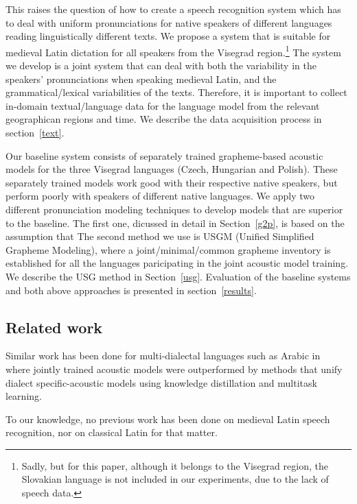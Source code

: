 \documentclass[runningheads,a4paper]{llncs}
\begin{document}
This raises the question of how to create a speech recognition system which has to deal with uniform pronunciations for native speakers of different languages reading linguistically different texts.
We propose a system that is suitable for medieval Latin dictation for all speakers from the Visegrad region.\footnote{Sadly, but for this paper, although it belongs to the Visegrad region, the Slovakian language is not included in our experiments, due to the lack of speech data.}
The system we develop is a joint system that can deal with both the variability in the speakers' pronunciations when speaking medieval Latin, and the grammatical/lexical variabilities of the texts.
Therefore, it is important to collect in-domain textual/language data for the language model from the relevant geographican regions and time.
We describe the data acquisition process in section~\ref{text}.

Our baseline system consists of separately trained grapheme-based acoustic models for the three Visegrad languages (Czech, Hungarian and Polish). 
These separately trained models work good with their respective native speakers, but perform poorly with speakers of different native languages.
We apply two different pronunciation modeling techniques to develop models that are superior to the baseline.
The first one, dicussed in detail in Section~\ref{g2p}, is based on the assumption that 
The second method we use is USGM (Unified Simplified Grapheme Modeling), where a joint/minimal/common grapheme inventory is established for all the languages paricipating in the joint acoustic model training.
We describe the USG method in Section~\ref{usg}.
Evaluation of the baseline systems and both above approaches is presented in section~\ref{results}.

\subsection{Related work}
Similar work has been done for multi-dialectal languages such as Arabic in~\cite{elfeky16} where jointly trained acoustic models were outperformed by methods that unify dialect specific-acoustic models using knowledge distillation and multitask learning.

To our knowledge, no previous work has been done on medieval Latin speech recognition, nor on classical Latin for that matter.
\end{document}
